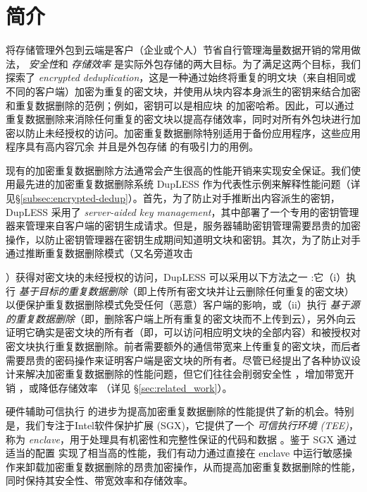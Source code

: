 \section{简介}
\label{sec:introduction}

将存储管理外包到云端是客户（企业或个人）节省自行管理海量数据开销的常用做法，\textit{ 安全性}和\textit{ 存储效率} 是实际外包存储的两大目标。为了满足这两个目标，我们探索了 \textit{ encrypted deduplication}，这是一种通过始终将重复的明文块（来自相同或不同的客户端）加密为重复的密文块，并使用从块内容本身派生的密钥来结合加密和重复数据删除的范例；例如，密钥可以是相应块 \cite{douceur02} 的加密哈希。因此，可以通过重复数据删除来消除任何重复的密文块以提高存储效率，同时对所有外包块进行加密以防止未经授权的访问。加密重复数据删除特别适用于备份应用程序，这些应用程序具有高内容冗余 \cite{wallace12} 并且是外包存储 \cite{hasan05,kotla07,varble09} 的有吸引力的用例。

现有的加密重复数据删除方法通常会产生很高的性能开销来实现安全保证。我们使用最先进的加密重复数据删除系统 DupLESS \cite{bellare13b} 作为代表性示例来解释性能问题（详见\S\ref{subsec:encrypted-dedup}）。首先，为了防止对手推断出内容派生的密钥，DupLESS 采用了 \textit{ server-aided key management}，其中部署了一个专用的密钥管理器来管理来自客户端的密钥生成请求。但是，服务器辅助密钥管理需要昂贵的加密操作，以防止密钥管理器在密钥生成期间知道明文块和密钥。其次，为了防止对手通过推断重复数据删除模式（又名旁道攻击

\cite{harnik2010side, halevi2011proofs}）获得对密文块的未经授权的访问，DupLESS 可以采用以下方法之一 :它（i）执行 \textit{ 基于目标的重复数据删除}（即上传所有密文块并让云删除任何重复的密文块）以便保护重复数据删除模式免受任何（恶意）客户端的影响，或（ii）执行\textit{ 基于源的重复数据删除}（即，删除客户端上所有重复的密文块而不上传到云），另外向云证明它确实是密文块的所有者（即，可以访问相应明文块的全部内容）和被授权对密文块执行重复数据删除。前者需要额外的通信带宽来上传重复的密文块，而后者需要昂贵的密码操作来证明客户端是密文块的所有者。尽管已经提出了各种协议设计来解决加密重复数据删除的性能问题，但它们往往会削弱安全性 \cite{li20b,xu13,pietro12}，增加带宽开销 \cite{harnik10,li15}，或降低存储效率 \cite{zhou15, qin17,li20b}（详见 \S\ref{sec:related_work}）。
  
硬件辅助可信执行 \cite{trustzone,sgx,Mktem,Amdsev} 的进步为提高加密重复数据删除的性能提供了新的机会。特别是，我们专注于Intel软件保护扩展 (SGX)，它提供了一个 \textit{ 可信执行环境 (TEE)}，称为 \textit{ enclave}，用于处理具有机密性和完整性保证的代码和数据 \cite{baumann14 }。鉴于 SGX 通过适当的配置 \cite{harnik18} 实现了相当高的性能，我们有动力通过直接在 enclave 中运行敏感操作来卸载加密重复数据删除的昂贵加密操作，从而提高加密重复数据删除的性能，同时保持其安全性、带宽效率和存储效率。


